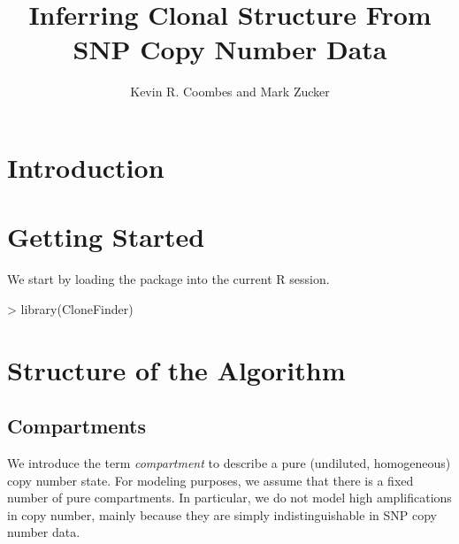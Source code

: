 \documentclass{article}
\title{Inferring Clonal Structure From SNP Copy Number Data}
\author{Kevin R. Coombes and Mark Zucker}
\begin{document}


\maketitle
\tableofcontents

\section{Introduction}


\section{Getting Started}

We start by loading the package into the current R session.
\begin{Schunk}
\begin{Sinput}
> library(CloneFinder)
\end{Sinput}
\end{Schunk}

\section{Structure of the Algorithm}

\subsection{Compartments}
We introduce the term \textit{compartment} to describe a pure
(undiluted, homogeneous) copy number state.  For modeling purposes, we
assume that there is a fixed number of pure compartments.  In
particular, we do not model high amplifications in copy number, mainly
because they are simply indistinguishable in SNP copy number data.
\end{document}
